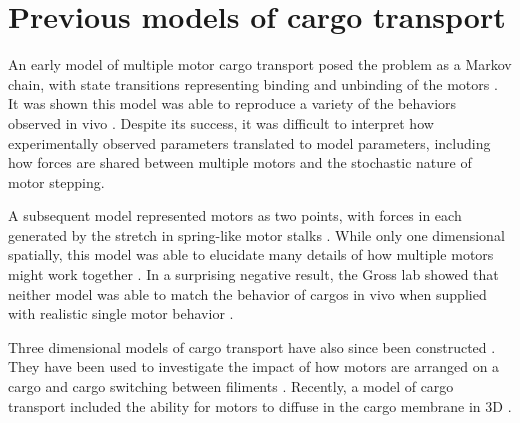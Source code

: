\section{Previous models of cargo transport}

An early model of multiple motor cargo transport posed the problem as a Markov chain, with state transitions representing binding and unbinding of the motors \cite{Klumpp2005}. It was shown this model was able to reproduce a variety of the behaviors observed in vivo \cite{Muller2008}. Despite its success, it was difficult to interpret how experimentally observed parameters translated to model parameters, including how forces are shared between multiple motors and the stochastic nature of motor stepping.

A subsequent model represented motors as two points, with forces in each generated by the stretch in spring-like motor stalks \cite{Kunwar2008}. While only one dimensional spatially, this model was able to elucidate many details of how multiple motors might work together \cite{Kunwar2010}. In a surprising negative result, the Gross lab showed that neither model was able to match the behavior of cargos in vivo when supplied with realistic single motor behavior \cite{Kunwar2011}.

Three dimensional models of cargo transport have also since been constructed \cite{Korn2009,Erickson2011,Lombardo2017}. They have been used to investigate the impact of how motors are arranged on a cargo \cite{Erickson2011} and cargo switching between filiments \cite{Erickson2013}. Recently, a model of cargo transport included the ability for motors to diffuse in the cargo membrane in 3D \cite{Lombardo2017}.